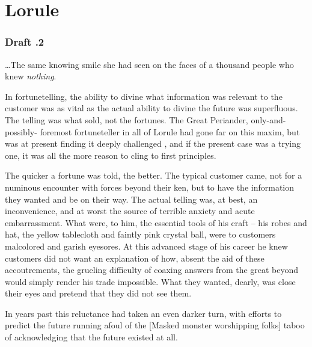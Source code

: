 \documentclass[../FGP.tex]{subfiles}
\begin{document}
\section{Lorule}\begin{fragment}\label{nofortunes}


\subsubsection{Draft \thefragment.2}
\ldots The same knowing smile she had seen on the faces of a thousand people who knew \emph{nothing}. 
\end{fragment}

\begin{fragment}In fortunetelling, the ability to divine what information was relevant to the customer was as vital as the actual ability to divine the future was superfluous. The telling was what sold, not the fortunes. The Great Periander, only-and-possibly- foremost fortuneteller in all of Lorule had gone far on this maxim, but was at present finding it deeply challenged , and if the present case was a trying one, it was all the more reason to cling to first principles.\end{fragment}
                    
\begin{fragment}The quicker a fortune was told, the better. The typical customer came, not for a numinous encounter with forces beyond their ken, but to have the information they wanted and be on their way.  The actual telling was, at best, an inconvenience, and at worst the source of terrible anxiety and acute embarrassment. What were, to him, the essential tools of his craft -- his robes and hat, the yellow tablecloth and faintly pink crystal ball, were to customers malcolored and garish eyesores. At this advanced stage of his career he knew customers did not want an explanation of how, absent the aid of these accoutrements, the grueling difficulty of coaxing answers from the great beyond would simply render his trade impossible. What they wanted, dearly, was close their eyes and pretend that they did not see them.\end{fragment} 

\begin{fragment}In years past this reluctance had taken an even darker turn, with efforts to predict the future running afoul of the [Masked monster worshipping folks] taboo of acknowledging that the future existed at all. \end{fragment}
\end{document}
